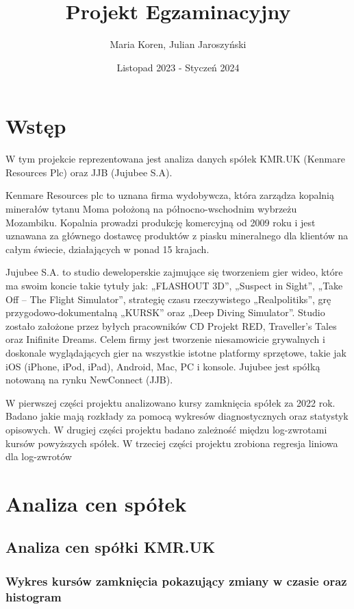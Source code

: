 \documentclass[a4paper,11pt]{article}
\title{Projekt Egzaminacyjny}
\author{Maria Koren, Julian Jaroszyński}
\date{Listopad 2023 - Styczeń 2024}
\begin{document}
\maketitle
\newpage
\tableofcontents{}
\newpage

\section{Wstęp}
W tym projekcie reprezentowana jest analiza danych spółek KMR.UK (Kenmare Resources Plc) oraz JJB (Jujubee S.A). 

Kenmare Resources plc to uznana firma wydobywcza, która zarządza kopalnią minerałów tytanu Moma położoną na północno-wschodnim wybrzeżu Mozambiku.
Kopalnia prowadzi produkcję komercyjną od 2009 roku i jest uznawana za głównego dostawcę produktów z piasku mineralnego dla klientów na całym świecie, działających w ponad
15 krajach.

Jujubee S.A. to studio deweloperskie zajmujące
się tworzeniem gier wideo, które ma swoim koncie
takie tytuły jak: „FLASHOUT 3D”, „Suspect in
Sight”, „Take Off – The Flight Simulator”,
strategię czasu rzeczywistego „Realpolitiks”, grę
przygodowo-dokumentalną „KURSK” oraz „Deep Diving
Simulator”. Studio zostało założone przez byłych
pracowników CD Projekt RED, Traveller’s Tales oraz
Inifinite Dreams. Celem firmy jest tworzenie niesamowicie
grywalnych i doskonale wyglądających gier na wszystkie
istotne platformy sprzętowe, takie jak iOS (iPhone,
iPod, iPad), Android, Mac, PC i konsole. Jujubee jest
spółką notowaną na rynku NewConnect (JJB).

W pierwszej części projektu analizowano kursy zamknięcia spółek za 2022 rok. Badano jakie mają rozkłady za pomocą wykresów diagnostycznych oraz statystyk opisowych. W drugiej części projektu badano zależność międzu log-zwrotami kursów powyższych spółek. W trzeciej części projektu zrobiona regresja liniowa dla log-zwrotów

\newpage
\section{Analiza cen spółek}
\subsection{Analiza cen spółki KMR.UK}
\subsubsection{Wykres kursów zamknięcia pokazujący zmiany w czasie oraz
histogram}
\end{document}
